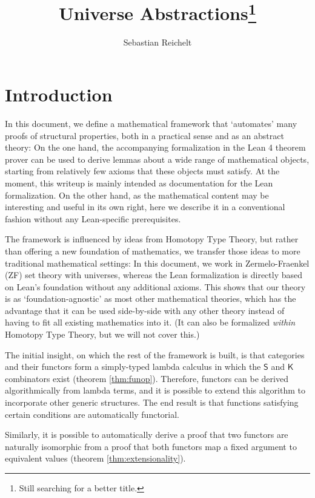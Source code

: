 \documentclass[a4paper]{article}
\title{Universe Abstractions\footnote{Still searching for a better title.}}
\author{Sebastian Reichelt}
\theoremstyle{definition}
\theoremstyle{remark}
\newcommand{\nm}{\mathsf}
\begin{document}
\maketitle

\section{Introduction}

In this document, we define a mathematical framework that `automates' many proofs of structural properties,
both in a practical sense and as an abstract theory: On the one hand, the accompanying formalization in the
Lean 4 theorem prover\cite{Lean} can be used to derive lemmas about a wide range of mathematical objects,
starting from relatively few axioms that these objects must satisfy. At the moment, this writeup is
mainly intended as documentation for the Lean formalization. On the other hand, as the mathematical content
may be interesting and useful in its own right, here we describe it in a conventional fashion without any
Lean-specific prerequisites.

The framework is influenced by ideas from Homotopy Type Theory\cite{HoTT}, but rather than offering
a new foundation of mathematics, we transfer those ideas to more traditional mathematical settings: In this
document, we work in Zermelo-Fraenkel (ZF) set theory with universes, whereas the Lean formalization is
directly based on Lean's foundation without any additional axioms. This shows that our theory is as
`foundation-agnostic' as most other mathematical theories, which has the advantage that it can be used
side-by-side with any other theory instead of having to fit all existing mathematics into it.
(It can also be formalized \emph{within} Homotopy Type Theory, but we will not cover this.)

The initial insight, on which the rest of the framework is built, is that categories and their functors
form a simply-typed lambda calculus in which the $\nm{S}$ and $\nm{K}$ combinators exist (theorem
\ref{thm:funop}).
Therefore, functors can be derived algorithmically from lambda terms, and it is possible to extend this
algorithm to incorporate other generic structures. The end result is that functions satisfying certain
conditions are automatically functorial.

Similarly, it is possible to automatically derive a proof that two functors are naturally isomorphic
from a proof that both functors map a fixed argument to equivalent values (theorem
\ref{thm:extensionality}).
\end{document}
